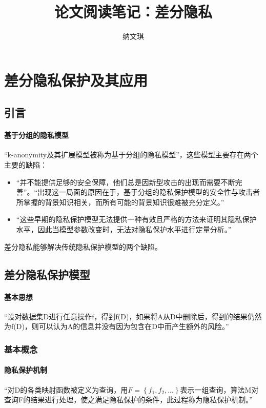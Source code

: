 \documentclass[12pt,a4paper]{article}
\begin{document}

\title{论文阅读笔记：差分隐私}
\author{纳文琪}
\maketitle


\section{差分隐私保护及其应用\cite{熊平2014}}
\subsection{引言}
\paragraph{基于分组的隐私模型} “k-anonymity及其扩展模型被称为基于分组的隐私模型”，这些模型主要存在两个主要的缺陷：
\begin{itemize}
	\item “并不能提供足够的安全保障，他们总是因新型攻击的出现而需要不断完善”。“出现这一局面的原因在于，基于分组的隐私保护模型的安全性与攻击者所掌握的背景知识相关，而所有可能的背景知识很难被充分定义。”
	\item “这些早期的隐私保护模型无法提供一种有效且严格的方法来证明其隐私保护水平，因此当模型参数改变时，无法对隐私保护水平进行定量分析。”
\end{itemize}
差分隐私能够解决传统隐私保护模型的两个缺陷。
\subsection{差分隐私保护模型}
\paragraph{基本思想} “设对数据集D进行任意操作f，得到f(D)，如果将A从D中删除后，得到的结果仍然为f(D)，则可以认为A的信息并没有因为包含在D中而产生额外的风险。”

\subsubsection{基本概念}
\paragraph{隐私保护机制} “对D的各类映射函数被定义为查询，用$F=\left \{ f_1, f_2,... \right \}$表示一组查询，算法M对查询F的结果进行处理，使之满足隐私保护的条件，此过程称为隐私保护机制。”
\end{document}
